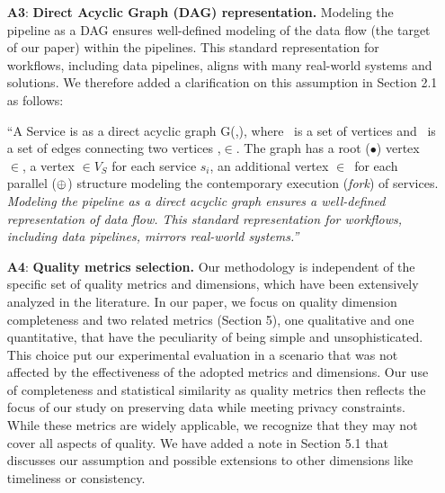 {\begin{enumerate}
        \item[\textbf{A3}:] \textbf{Direct Acyclic Graph (DAG) representation.} Modeling the pipeline as a DAG ensures well-defined modeling of the data flow (the target of our paper) within the pipelines. This standard representation for workflows, including data pipelines, aligns with many real-world systems and solutions. We therefore added a clarification on this assumption in Section 2.1 as follows:
              
              \vspace{0.5em}
              
              \begin{adjustwidth}{10pt}{10pt}
                ``A Service \pipeline is as a direct acyclic graph G(\V,\E), where \V\ is a set of vertices and \E\ is a set of edges connecting two vertices ,$\in$\V.
  The graph has a root ($\bullet$) vertex $\in$\V, a vertex $\in$$V_S$ for each service $s_i$, an additional vertex $\in$\V\ for each parallel ($\oplus$) structure modeling the contemporary execution (\emph{fork}) of services.
                  \em{\color{OurColor}Modeling the pipeline as a direct acyclic graph ensures a well-defined representation of data flow. This standard representation for workflows, including data pipelines, mirrors real-world systems.}''
                  \vspace{0.5em}
              \end{adjustwidth}
              
        \item[\textbf{A4}:] \textbf{Quality metrics selection.} Our methodology is independent of the specific set of quality metrics and dimensions, which have been extensively analyzed in the literature. In our paper, we focus on quality dimension completeness and two related metrics (Section 5), one qualitative and one quantitative, that have the peculiarity of being simple and unsophisticated. This choice put our experimental evaluation in a scenario that was not affected by the effectiveness of the adopted metrics and dimensions. Our use of completeness and statistical similarity as quality metrics then reflects the focus of our study on preserving data while meeting privacy constraints. While these metrics are widely applicable, we recognize that they may not cover all aspects of quality. We have added a note in Section 5.1 that discusses our assumption and possible extensions to other dimensions like timeliness or consistency.
              \vspace{0.5em}
        

\end{enumerate}}
